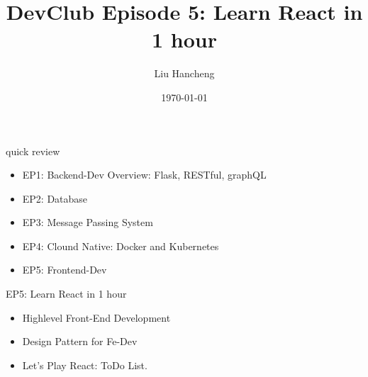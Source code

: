 \documentclass{beamer}
\date{\today}
\author{Liu Hancheng}
\title{DevClub Episode 5: Learn React in 1 hour}
\begin{document}
    \maketitle
    \begin{frame}{quick review}
        \begin{itemize}
            \item EP1: Backend-Dev Overview: Flask, RESTful, graphQL
            \item EP2: Database
            \item EP3: Message Passing System
            \item EP4: Clound Native: Docker and Kubernetes
            \item EP5: Frontend-Dev 

        \end{itemize}
        
    \end{frame}
    
    \begin{frame}{EP5: Learn React in 1 hour}
        \begin{itemize}
                \item Highlevel Front-End Development
                \item Design Pattern for Fe-Dev
                \item Let's Play React: ToDo List.
        \end{itemize}
    \end{frame}
    
\end{document}
